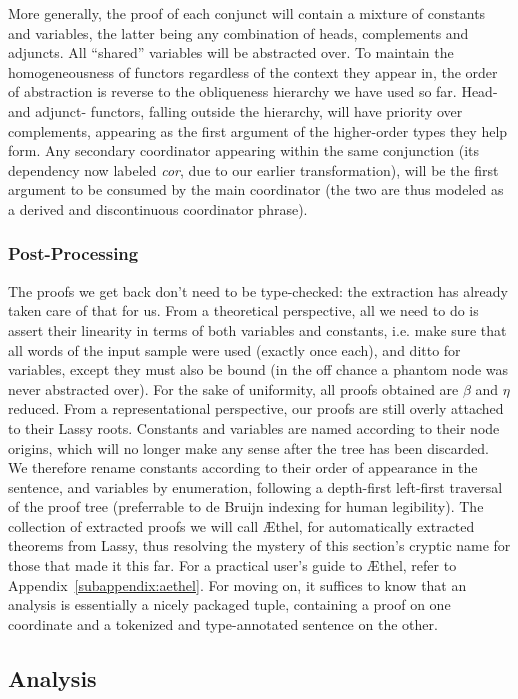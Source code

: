 More generally, the proof of each conjunct will contain a mixture of constants and variables, the latter being any combination of heads, complements and adjuncts.
All ``shared'' variables will be abstracted over.
To maintain the homogeneousness of functors regardless of the context they appear in, the order of abstraction is reverse to the obliqueness hierarchy we have used so far.
Head- and adjunct- functors, falling outside the hierarchy, will have priority over complements, appearing as the first argument of the higher-order types they help form.
Any secondary coordinator appearing within the same conjunction (its dependency now labeled \textit{cor}, due to our earlier transformation), will be the first argument to be consumed by the main coordinator (the two are thus modeled as a derived and discontinuous coordinator phrase).

\subsubsection{Post-Processing}
The proofs we get back don't need to be type-checked: the extraction has already taken care of that for us.
From a theoretical perspective, all we need to do is assert their linearity in terms of both variables and constants, i.e. make sure that all words of the input sample were used (exactly once each), and ditto for variables, except they must also be bound (in the off chance a phantom node was never abstracted over).
For the sake of uniformity, all proofs obtained are $\beta$ and $\eta$ reduced.
From a representational perspective, our proofs are still overly attached to their Lassy roots.
Constants and variables are named according to their node origins, which will no longer make any sense after the tree has been discarded.
We therefore rename constants according to their order of appearance in the sentence, and variables by enumeration, following a depth-first left-first traversal of the proof tree (preferrable to de Bruijn indexing for human legibility).
The collection of extracted proofs we will call \AE thel, for automatically extracted theorems from Lassy, thus resolving the mystery of this section's cryptic name for those that made it this far.
For a practical user's guide to \AE thel, refer to Appendix~\ref{subappendix:aethel}.
For moving on, it suffices to know that an analysis is essentially a nicely packaged tuple, containing a proof on one coordinate and a tokenized and type-annotated sentence on the other.

\subsection{Analysis}
